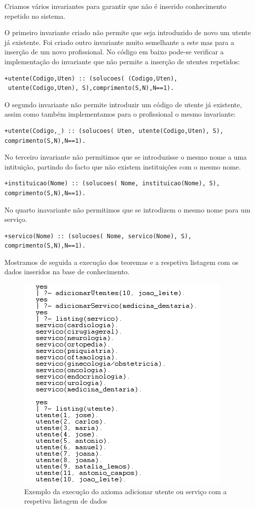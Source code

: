Criamos vários invariantes para garantir que não é inserido conhecimento repetido no sistema. 

O primeiro invariante criado não permite que seja introduzido de novo um utente já existente. Foi criado outro invariante muito semelhante a este mas para a inserção de um novo profissional. No código em baixo pode-se verificar a implementação do invariante que não permite a inserção de utentes repetidos: 


\begin{Verbatim}
+utente(Codigo,Uten) :: (solucoes( (Codigo,Uten),
 utente(Codigo,Uten), S),comprimento(S,N),N==1).
\end{Verbatim}

O segundo invariante não permite introduzir um código de utente já existente, assim como também implementamos para o profissional o mesmo invariante: 
\begin{Verbatim}
+utente(Codigo,_) :: (solucoes( Uten, utente(Codigo,Uten), S),
comprimento(S,N),N==1).
\end{Verbatim}

No terceiro invariante não permitimos que se introduzisse o mesmo nome a uma intituição, partindo do facto que não existem instituições com o mesmo nome. 

\begin{Verbatim}
+instituicao(Nome) :: (solucoes( Nome, instituicao(Nome), S),
comprimento(S,N),N==1). 
\end{Verbatim}
No quarto inavariante não permitimos que se introdizem o mesmo nome para um serviço. 

\begin{Verbatim}
+servico(Nome) :: (solucoes( Nome, servico(Nome), S),
comprimento(S,N),N==1). 
\end{Verbatim}

Mostramos de seguida a execução dos teoremas e a respetiva listagem com os dados inseridos na base de conhecimento. 

\begin{figure}[<+htpb+>]
	\centering
	\includegraphics[scale=0.9]{answer9.png}
	\caption{Exemplo da execução do axioma adicionar utente ou serviço com a respetiva listagem de dados}
	\label{p3:fig:output9}
\end{figure}

